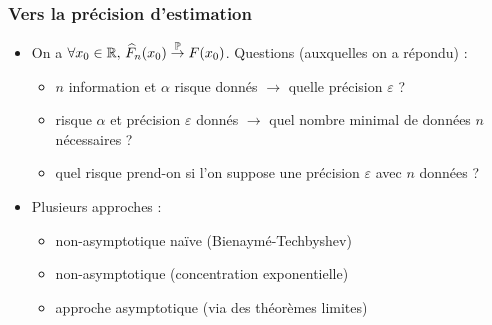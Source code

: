 \begin{frame}
\frametitle{Vers la précision d'estimation}
\begin{itemize}
\item On a $\forall x_0 \in \operatorname{{\mathbb R}},\,\widehat F_n(x_0)\stackrel{\operatorname{{\mathbb P}}}{\rightarrow} F(x_0)$. 
\alert{Questions (auxquelles on a répondu)} :
\begin{itemize}
\item $n$ \alert{information} et $\alpha$ \alert{risque} donnés $\rightarrow$ quelle  \alert{précision} $\varepsilon$ ?
\item risque $\alpha$ et précision $\varepsilon$ donnés $\rightarrow$ quel nombre minimal de données $n$ nécessaires ?
\item quel risque prend-on si l'on suppose une précision $\varepsilon$ avec $n$ données ?
\end{itemize}

\item Plusieurs approches :
\begin{itemize}
\item non-asymptotique naïve (Bienaymé-Techbyshev) 
\item non-asymptotique (concentration exponentielle)
\item approche asymptotique (via des théorèmes limites)
\end{itemize}
\end{itemize}
\end{frame}

